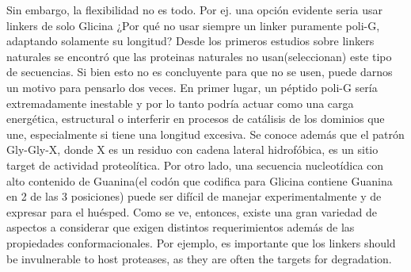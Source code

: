 Sin embargo, la flexibilidad no es todo. 
Por ej. una opción evidente seria usar linkers de solo Glicina ¿Por qué no usar siempre un linker puramente poli-G, adaptando solamente su longitud?
Desde los primeros estudios sobre linkers naturales \cite{argos1990investigation} se encontró que las proteinas naturales no usan(seleccionan) este tipo de secuencias.
Si bien esto no es concluyente para que no se usen, puede darnos un motivo para pensarlo dos veces.
En primer lugar, un péptido poli-G sería extremadamente inestable y por lo tanto podría actuar como una carga energética, estructural o interferir en procesos de catálisis de los dominios que une, 
especialmente si tiene una longitud excesiva.
Se conoce además que el patrón Gly-Gly-X, donde X es un residuo con cadena lateral hidrofóbica, es un sitio target de actividad proteolítica. 
Por otro lado, una secuencia nucleotídica con alto contenido de Guanina(el codón que codifica para Glicina contiene Guanina en 2 de las 3 posiciones) puede ser difícil de manejar experimentalmente y de expresar para el huésped.
Como se ve, entonces, existe una gran variedad de aspectos a considerar que exigen distintos requerimientos además de las propiedades conformacionales.
Por ejemplo, es importante que los linkers should be invulnerable to host proteases, as they are often the targets for degradation. 


